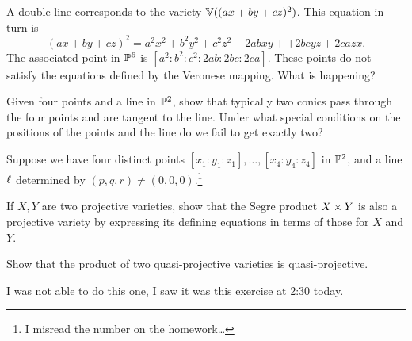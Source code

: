 \documentclass[12pt]{memoir}
\begin{document}
\begin{ptcbr}
  A double line corresponds to the variety $\mathbb{V}((ax + by + cz)^2)$. This equation in turn is 
  $$(ax + by + cz)^2=a^2 x^2 + b^2 y^2  + c^2 z^2 + 2 a b x y + + 2 b c y z + 2 c a z x.$$
  The associated point in $\mathbb{P}^6$ is $[a^2:b^2:c^2:2ab:2bc:2ca]$. These points do not satisfy the equations defined by the Veronese mapping. What is happening?
\end{ptcbr}

\begin{Ej}[5.2.3]
  Given four points and a line in $\mathbb{P}^2$, show that typically
two conics pass through the four points and are tangent to the line. Under
what special conditions on the positions of the points and the line do we
fail to get exactly two? 
\end{Ej}

\begin{ptcbr}
  Suppose we have four distinct points $[x_1:y_1:z_1],\dots,[x_4:y_4:z_4]$ in $\mathbb{P}^2$, and a line $\ell$ determined by $(p,q,r)\neq(0,0,0)$.\footnote{I misread the number on the homework\dots}
\end{ptcbr}

\begin{Ej}[\textbf{5.3.2}]
  If $X,Y$ are two projective varieties, show that the Segre product $X\times Y$ is also a projective variety by expressing its defining equations in terms of those for $X$ and $Y$.\par 
  Show that the product of two quasi-projective varieties is quasi-projective.
\end{Ej}


\begin{ptcbr}
  I was not able to do this one, I saw it was this exercise at 2:30 today. 
\end{ptcbr}
\end{document}
